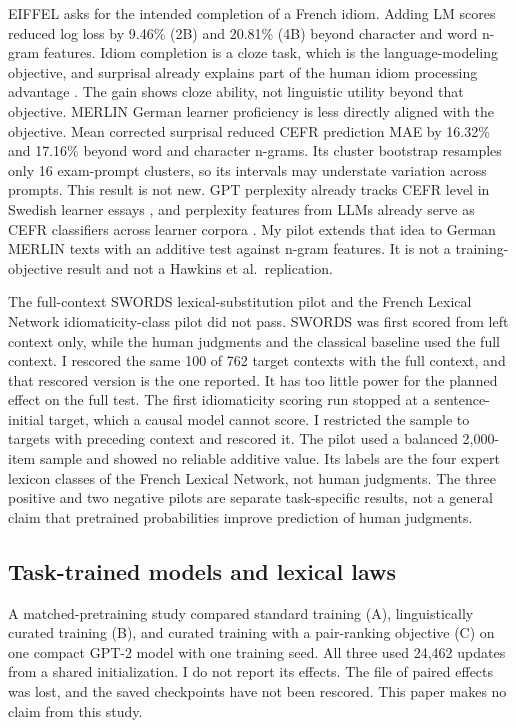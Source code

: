 \documentclass[11pt]{article}
\begin{document}
EIFFEL \citep{eiffel} asks for the intended completion of a French idiom.
Adding LM scores reduced log loss by 9.46\% (2B) and 20.81\% (4B) beyond
character and word n-gram features. Idiom completion is a cloze task, which is
the language-modeling objective, and surprisal already explains part of the
human idiom processing advantage \citep{socolof2025idiom}. The gain shows
cloze ability, not linguistic utility beyond that objective. MERLIN
\citep{merlin2014} German learner proficiency is less directly aligned with
the objective. Mean corrected surprisal reduced CEFR prediction MAE by
16.32\% and 17.16\% beyond word and character n-grams. Its cluster bootstrap
resamples only 16 exam-prompt clusters, so its intervals may understate
variation across prompts. This result is not new. GPT perplexity already
tracks CEFR level in Swedish learner essays \citep{munozsanchez2024perplexity},
and perplexity features from LLMs already serve as CEFR classifiers across
learner corpora \citep{stearns2026cefr}. My pilot extends that idea to German
MERLIN texts with an additive test against n-gram features. It is not a
training-objective result and not a Hawkins et al.\ replication.

The full-context SWORDS lexical-substitution pilot \citep{lee2021swords} and
the French Lexical Network idiomaticity-class pilot \citep{liu2024idiom} did
not pass. SWORDS was first scored from left context only, while
the human judgments and the classical baseline used the full context. I
rescored the same 100 of 762 target contexts with the full context, and that
rescored version is the one reported. It has too little power for the planned
effect on the full test. The first idiomaticity scoring run stopped at a sentence-initial target,
which a causal model cannot score. I restricted the sample to targets with
preceding context and rescored it. The pilot used a balanced
2,000-item sample and showed no reliable additive value. Its labels are the
four expert lexicon classes of the French Lexical Network, not human
judgments. The three positive
and two negative pilots are separate task-specific results, not a general
claim that pretrained probabilities improve prediction of human judgments.

\subsection{Task-trained models and lexical laws}

A matched-pretraining study compared standard training (A), linguistically
curated training (B), and curated training with a pair-ranking objective (C)
on one compact GPT-2 model with one training seed. All three used 24,462
updates from a shared initialization. I do not report its effects. The file
of paired effects was lost, and the saved checkpoints have not been rescored.
This paper makes no claim from this study.
\end{document}
